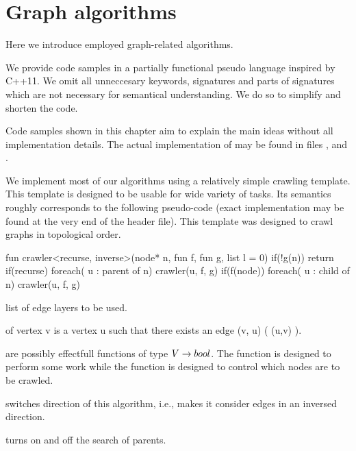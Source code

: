 
\section{Graph algorithms}

Here we introduce employed graph-related algorithms. 

We provide code samples in a partially functional pseudo language inspired by C++11. We omit all unneccesary keywords, signatures and parts of signatures which are not necessary for semantical understanding. We do so to simplify and shorten the code.

Code samples shown in this chapter aim to explain the main ideas without all implementation details. The actual implementation of may be found in files ,  and .

We implement most of our algorithms using a relatively simple crawling template. This template is designed to be usable for wide variety of tasks. Its semantics roughly corresponds to the following pseudo-code (exact implementation may be found at the very end of the  header file). This template was designed to crawl graphs in topological order.

\mybeginfig %
\begin{code}
fun crawler<recurse, inverse>(node* n, fun f, fun g, list l = {0})
{
  if(!g(n))
    return
  if(recurse)
    foreach( u : parent of n)
      crawler(u, f, g)
  if(f(node))
    foreach( u : child of n)
      crawler(u, f, g)
}
\end{code}

\begin{description}
  \item {} list of edge layers to be used.
  \item {} of vertex v is a vertex u such that there exists an edge (v, u) ( (u,v) ).
  \item {} are possibly effectfull functions of type $V \rightarrow bool$. The function  is designed to perform some work while the  function is designed to control which nodes are to be crawled.
  \item {} switches direction of this algorithm, i.e., makes it consider edges in an inversed direction.
  \item {} turns on and off the search of parents.
\end{description}

